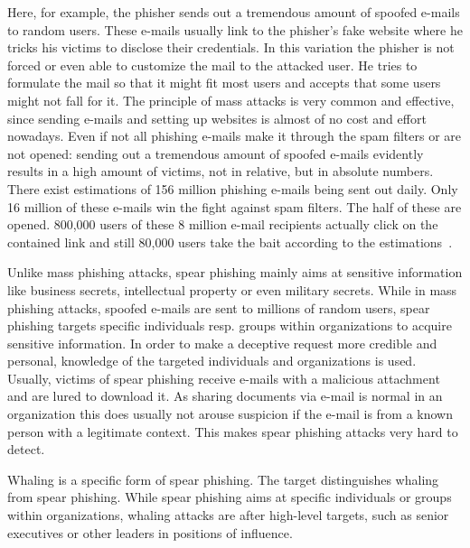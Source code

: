 \begin{description}[leftmargin=0cm]
	\item[Mass Phishing] Here, for example, the phisher sends out a tremendous amount of spoofed e-mails to random users.
 These e-mails usually link to the phisher's fake website where he tricks his victims to disclose their credentials.
 In this variation the phisher is not forced or even able to customize the mail to the attacked user.
 He tries to formulate the mail so that it might fit most users and accepts that some users might not fall for it.
 The principle of mass attacks is very common and effective, since sending e-mails and setting up websites is almost of no cost and effort nowadays.
 Even if not all phishing e-mails make it through the spam filters or are not opened: sending out a tremendous amount of spoofed e-mails evidently results in a high amount of victims, not in relative, but in absolute numbers.
 There exist estimations of 156 million phishing e-mails being sent out daily.
 Only 16 million of these e-mails win the fight against spam filters.
 The half of these are opened.
 800,000 users of these 8 million e-mail recipients actually click on the contained link and still 80,000 users take the bait according to the estimations~\cite{takethebait}.  
	\item[Spear Phishing] Unlike mass phishing attacks, spear phishing mainly aims at sensitive information like business secrets, intellectual property or even military secrets.
 While in mass phishing attacks, spoofed e-mails are sent to millions of random users, spear phishing targets specific individuals resp.
 groups within organizations to acquire sensitive information.
 In order to make a deceptive request more credible and personal, knowledge of the targeted individuals and organizations is used.
 Usually, victims of spear phishing receive e-mails with a malicious attachment and are lured to download it.
 As sharing documents via e-mail is normal in an organization this does usually not arouse suspicion if the e-mail is from a known person with a legitimate context.
 This makes spear phishing attacks very hard to detect\cite{trendlabs2012spear,statephishinghong}.
	\item[Whaling] Whaling is a specific form of spear phishing.
 The target distinguishes whaling from spear phishing.
 While spear phishing aims at specific individuals or groups within organizations, whaling attacks are after high-level targets, such as senior executives or other leaders in positions of influence.

\end{description}

